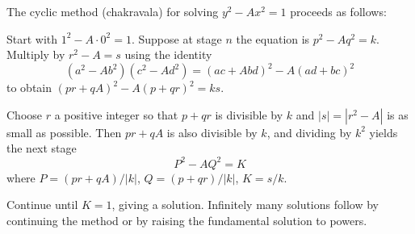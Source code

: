 The cyclic method (chakravala) for solving $y^2 - Ax^2 = 1$ proceeds as follows:

Start with $1^2 - A \cdot 0^2 = 1$. Suppose at stage $n$ the equation is $p^2 - Aq^2 = k$. Multiply by $r^2 - A = s$ using the identity
$$(a^2 - Ab^2)(c^2 - Ad^2) = (ac + Abd)^2 - A(ad + bc)^2$$
to obtain $(pr + qA)^2 - A(p + qr)^2 = ks$.

Choose $r$ a positive integer so that $p + qr$ is divisible by $k$ and $|s| = |r^2 - A|$ is as small as possible. Then $pr + qA$ is also divisible by $k$, and dividing by $k^2$ yields the next stage
$$P^2 - AQ^2 = K$$
where $P = (pr + qA)/|k|$, $Q = (p + qr)/|k|$, $K = s/k$.

Continue until $K = 1$, giving a solution. Infinitely many solutions follow by continuing the method or by raising the fundamental solution to powers.
